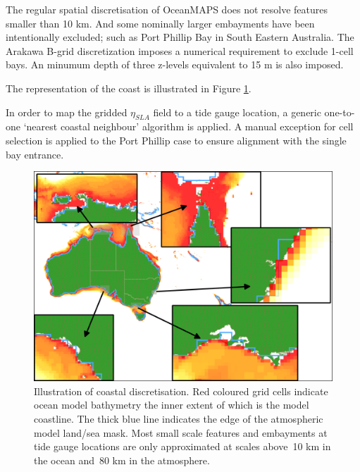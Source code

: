 The regular spatial discretisation of OceanMAPS does not resolve features smaller than 10 km.   
And some nominally larger embayments have been intentionally excluded; such as Port Phillip Bay in South Eastern Australia.
The Arakawa B-grid discretization imposes a numerical requirement to exclude 1-cell bays. 
An minumum depth of three z-levels equivalent to 15 m is also imposed.

The representation of the coast is illustrated in Figure \ref{fig:map_masks}.

In order to map the gridded $\eta_{SLA}$ field to a tide gauge location, a generic one-to-one `nearest coastal neighbour' algorithm is applied.
A manual exception for cell selection is applied to the Port Phillip case to ensure alignment with the single bay entrance. 
\vspace{6pt}
\begin{figure}[H]
    \centering
    \includegraphics[width=1.0\textwidth]{figures/maps/omaps_masks.png}
    \caption{Illustration of coastal discretisation.  Red coloured grid cells indicate ocean model bathymetry the inner extent of which is the model coastline.  The thick blue line indicates the edge of the atmospheric model land/sea mask.  Most small scale features and embayments at tide gauge locations are only approximated at scales above~10 km in the ocean and~80 km in the atmosphere. }
    \label{fig:map_masks}
\end{figure}  


